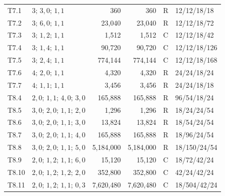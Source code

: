 \begin{longtable}{llrrcl}
T7.1 & $3;\,3,0;\,1,1$ & 360 & 360 & R & 12/12/18/18 \\
T7.2 & $3;\,6,0;\,1,1$ & 23,040 & 23,040 & R & 12/12/18/72 \\
T7.3 & $3;\,1,2;\,1,1$ & 1,512 & 1,512 & C & 12/12/18/42 \\
T7.4 & $3;\,1,4;\,1,1$ & 90,720 & 90,720 & C & 12/12/18/126 \\
T7.5 & $3;\,2,4;\,1,1$ & 774,144 & 774,144 & C & 12/12/18/168 \\
T7.6 & $4;\,2,0;\,1,1$ & 4,320 & 4,320 & R & 24/24/18/24 \\
T7.7 & $4;\,1,1;\,1,1$ & 3,456 & 3,456 & R & 24/24/18/18 \\
T8.4 & $2,0;\,1,1;\,4,0;\,3,0$ & 165,888 & 165,888 & R & 96/54/18/24 \\
T8.5 & $3,0;\,2,0;\,1,1;\,2,0$ & 1,296 & 1,296 & R & 18/24/24/54 \\
T8.6 & $3,0;\,2,0;\,1,1;\,3,0$ & 13,824 & 13,824 & R & 18/54/24/54 \\
T8.7 & $3,0;\,2,0;\,1,1;\,4,0$ & 165,888 & 165,888 & R & 18/96/24/54 \\
T8.8 & $3,0;\,2,0;\,1,1;\,5,0$ & 5,184,000 & 5,184,000 & R & 18/150/24/54 \\
T8.9 & $2,0;\,1,2;\,1,1;\,6,0$ & 15,120 & 15,120 & C & 18/72/42/24 \\
T8.10 & $2,0;\,1,2;\,1,2;\,2,0$ & 352,800 & 352,800 & C & 42/24/42/24 \\
T8.11 & $2,0;\,1,2;\,1,1;\,0,3$ & 7,620,480 & 7,620,480 & C & 18/504/42/24 \\
\bottomrule\end{longtable}
